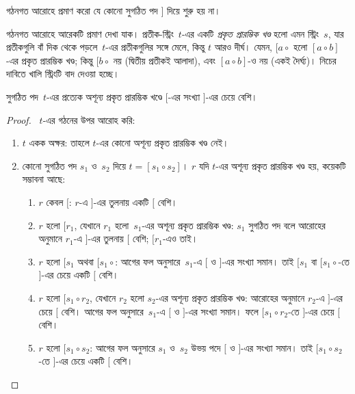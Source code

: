 \documentclass[../../../include/open-logic-section]{subfiles}
\begin{document}
\begin{prob}
  গঠনগত আরোহে প্রমাণ করো যে কোনো সুগঠিত পদ $]$
  দিয়ে শুরু হয় না।
\end{prob}

গঠনগত আরোহে আরেকটি প্রমাণ দেখা যাক। প্রতীক-স্ট্রিং~$t$-এর
একটি \emph{প্রকৃত প্রারম্ভিক খণ্ড} হলো এমন স্ট্রিং~$s$,
যার প্রতীকগুলি বাঁ দিক থেকে পড়লে~$t$-এর প্রতীকগুলির
সঙ্গে মেলে, কিন্তু $t$ আরও দীর্ঘ। যেমন, $[a \circ {}$
হলো $[a \circ b]$-এর প্রকৃত প্রারম্ভিক খণ্ড; কিন্তু
$[b \circ {}$ নয় (দ্বিতীয় প্রতীকই আলাদা), এবং
$[a \circ b]$-ও নয় (একই দৈর্ঘ্য)। নিচের দাবিতে
খালি স্ট্রিংটি বাদ দেওয়া হচ্ছে।

\begin{prop}
  সুগঠিত পদ~$t$-এর প্রত্যেক অশূন্য প্রকৃত প্রারম্ভিক
  খণ্ডে $[$-এর সংখ্যা $]$-এর চেয়ে বেশি।
\end{prop}

\begin{proof}
~$t$-এর গঠনের উপর আরোহ করি:
  \begin{enumerate}
  \item $t$ একক অক্ষর: তাহলে $t$-এর কোনো অশূন্য প্রকৃত
    প্রারম্ভিক খণ্ড নেই।
  \item কোনো সুগঠিত পদ $s_1$ ও~$s_2$ দিয়ে
    $t = [s_1 \circ s_2]$। $r$ যদি $t$-এর অশূন্য
    প্রকৃত প্রারম্ভিক খণ্ড হয়, কয়েকটি সম্ভাবনা আছে:
    \begin{enumerate}
    \item $r$ কেবল $[$: $r$-এ $]$-এর তুলনায় একটি
      $[$ বেশি।
    \item $r$ হলো $[r_1$, যেখানে $r_1$ হলো~$s_1$-এর
      অশূন্য প্রকৃত প্রারম্ভিক খণ্ড: $s_1$ সুগঠিত পদ
      বলে আরোহের অনুমানে $r_1$-এ $]$-এর তুলনায় $[$
      বেশি; $[r_1$-এও তাই।
    \item $r$ হলো $[s_1$ অথবা $[s_1 \circ {}$:
      আগের ফল অনুসারে~$s_1$-এ $[$ ও $]$-এর সংখ্যা সমান।
      তাই $[s_1$ বা $[s_1 \circ {}$-তে $]$-এর চেয়ে
      একটি $[$ বেশি।
    \item $r$ হলো $[s_1 \circ r_2$, যেখানে $r_2$ হলো
      $s_2$-এর অশূন্য প্রকৃত প্রারম্ভিক খণ্ড:
      আরোহের অনুমানে $r_2$-এ $]$-এর চেয়ে $[$ বেশি।
      আগের ফল অনুসারে~$s_1$-এ $[$ ও $]$-এর সংখ্যা সমান।
      ফলে $[s_1 \circ r_2$-তে $]$-এর চেয়ে $[$ বেশি।
    \item $r$ হলো $[s_1 \circ s_2$: আগের ফল অনুসারে
      $s_1$ ও~$s_2$ উভয় পদে $[$ ও $]$-এর সংখ্যা সমান।
      তাই $[s_1 \circ s_2$-তে $]$-এর চেয়ে একটি $[$ বেশি।
    \end{enumerate}
  \end{enumerate}
\end{proof}
\end{document}
